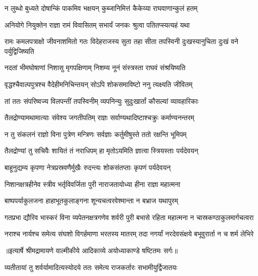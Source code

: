 \twolineshloka
{न लुब्धो बुध्यते दोषान्किं पाकमिव भक्षयन्}
{कुब्जानिमित्तं कैकेय्या राघवाणान्कुलं हतम्} %

\twolineshloka
{अनियोगे नियुक्तेन राज्ञा रामं विवासितम्}
{सभार्यं जनकः श्रुत्वा पतितप्स्यत्यहं यथा} %

\threelineshloka
{रामः कमलपत्राक्षो जीवनाशमितो गतः}
{विदेहराजस्य सुता तहा सीता तपस्विनी}
{दुःखस्यानुचिता दुःखं वने पर्युद्विजिष्यति} %

\twolineshloka
{नदतां भीमघोषाणां निशासु मृगपक्षिणाम्}
{निशम्य नूनं संस्त्रस्ता राघवं संश्रयिष्यति} %

\twolineshloka
{वृद्धश्चैवाल्पपुत्रश्च वैदेहीमनिचिन्तयन्}
{सोऽपि शोकसमाविष्टो ननु त्यक्ष्यति जीवितम्} %

\twolineshloka
{तां ततः संपरिष्वज्य विलपन्तीं तपस्विनीम्}
{व्यपनिन्युः सुदुःखार्तां कौसल्यां व्यावहारिकाः} %

\twolineshloka
{तैलद्रोण्यामथामात्याः संवेश्य जगतीपतिम्}
{राज्ञः सर्वाण्यथादिष्टाश्चक्रुः कर्माण्यनन्तरम्} %

\twolineshloka
{न तु संकलनं राज्ञो विना पुत्रेण मन्त्रिणः}
{सर्वज्ञाः कर्तुमीषुस्ते ततो रक्षन्ति भूमिपम्} %

\twolineshloka
{तैलद्रोण्यां तु सचिवैः शायितं तं नराधिपम्}
{हा मृतोऽयमिति ज्ञात्वा स्त्रियस्ताः पर्यदेवयन्} %

\twolineshloka
{बाहूनुद्यम्य कृपणा नेत्रप्रस्रवणैर्मुखैः}
{रुदन्त्यः शोकसंतप्ताः कृपणं पर्यदेवयन्} %

\twolineshloka
{निशानक्षत्रहीनेव स्त्रीव भर्तृविवर्जिता}
{पुरी नाराजतायोध्या हीना राज्ञा महात्मना} %

\twolineshloka
{बाष्पपर्याकुलजना हाहाभूतकुलाङ्गना}
{शून्यचत्वरवेश्मान्ता न बभ्राज यथापुरम्} %

\fourlineindentedshloka
{गतप्रभा द्यौरिव भास्करं विना}
{ व्यपेतनक्षत्रगणेव शर्वरी}
{पुरी बभासे रहिता महात्मना}
{ न चास्रकण्ठाकुलमार्गचत्वरा} %

\fourlineindentedshloka
{नराश्च नार्यश्च समेत्य संघशो}
{ विगर्हमाणा भरतस्य मातरम्}
{तदा नगर्यां नरदेवसंक्षये}
{ बभूवुरार्ता न च शर्म लेभिरे} %


{॥इत्यार्षे श्रीमद्रामायणे वाल्मीकीये आदिकाव्ये अयोध्याकाण्डे षष्टितमः सर्गः॥}


\twolineshloka
{व्यतीतायां तु शर्वर्यामादित्यस्योदये ततः}
{समेत्य राजकर्तारः सभामीयुर्द्विजातयः} %

